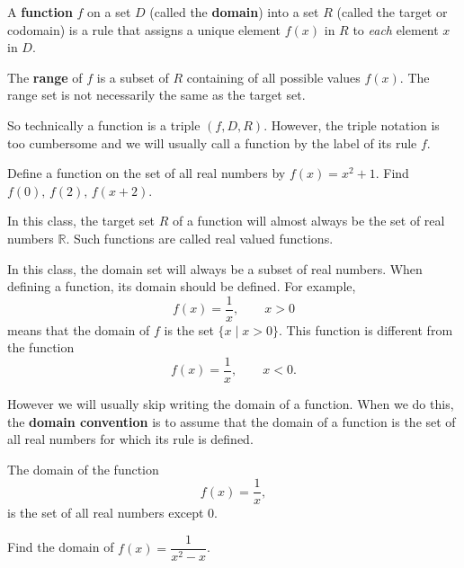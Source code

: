 \documentclass[../calc1-main.tex]{subfiles}
\begin{document}
  A \textbf{function} $f$ on a set $D$ (called the \textbf{domain}) into a set $R$ (called the target or codomain) is a rule that assigns a unique element $f(x)$ in $R$ to \textit{each} element $x$ in $D$.

  The \textbf{range} of $f$ is a subset of $R$ containing of all possible values $f(x)$. The range set is not necessarily the same as the target set.

  So technically a function is a triple $(f, D, R)$. However, the triple notation is too cumbersome and we will usually call a function by the label of its rule $f$.

  \begin{figure}[H]
    \centering
    \begin{subfigure}{0.3\textwidth}
      \centering
      
    \end{subfigure}
    \begin{subfigure}{0.3\textwidth}
      \centering
      
    \end{subfigure}
  \end{figure}

  \begin{example}
    Define a function on the set of all real numbers by $f(x)=x^2+1$. Find $f(0), \, f(2), \, f(x+2)$.
  \end{example}

  In this class, the target set $R$ of a function will almost always be the set of real numbers $\mathbb{R}$. Such functions are called real valued functions.

  In this class, the domain set will always be a subset of real numbers. When defining a function, its domain should be defined. For example,
  \[
    f(x) = \frac{1}{x}, \qquad x > 0
  \]
  means that the domain of $f$ is the set $\{x \mid x > 0\}$. This function is different from the function
  \[
    f(x) = \frac{1}{x}, \qquad x < 0.
  \]

  However we will usually skip writing the domain of a function. When we do this, the \textbf{domain convention} is to assume that the domain of a function is the set of all real numbers for which its rule is defined.

  The domain of the function
  \[
    f(x)=\frac{1}{x},
  \]
  is the set of all real numbers except $0$.


  \begin{example}
    Find the domain of $f(x) = \dfrac{1}{x^2 - x}$.
  \end{example}
\end{document}
